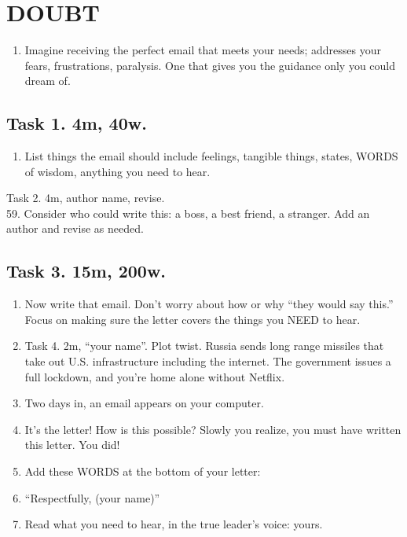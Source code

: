 \documentclass[
]{book}
\providecommand{\tightlist}{%
  \setlength{\itemsep}{0pt}\setlength{\parskip}{0pt}}
\begin{document}
\hypertarget{doubt}{%
\chapter{DOUBT}\label{doubt}}

\begin{enumerate}
\def\labelenumi{\arabic{enumi}.}
\setcounter{enumi}{56}
\tightlist
\item
  Imagine receiving the perfect email that meets your needs; addresses
  your fears, frustrations, paralysis. One that gives you the guidance
  only you could dream of.
\end{enumerate}

\hypertarget{task-1.-4m-40w.}{%
\section{Task 1. 4m, 40w.}\label{task-1.-4m-40w.}}

\begin{enumerate}
\def\labelenumi{\arabic{enumi}.}
\setcounter{enumi}{57}
\tightlist
\item
  List things the email should include feelings, tangible
  things, states, WORDS of wisdom, anything you need to hear.
\end{enumerate}

Task 2. 4m, author name, revise.\\
59. Consider who could write this: a
boss, a best friend, a stranger. Add an author and revise as needed.

\hypertarget{task-3.-15m-200w.}{%
\section{Task 3. 15m, 200w.}\label{task-3.-15m-200w.}}

\begin{enumerate}
\def\labelenumi{\arabic{enumi}.}
\setcounter{enumi}{59}
\tightlist
\item
  Now write that email. Don't worry about how or
  why ``they would say this.'' Focus on making sure the letter covers the
  things you NEED to hear.
\item
  Task 4. 2m, ``your name''. Plot twist. Russia sends long range missiles
  that take out U.S. infrastructure including the internet. The
  government issues a full lockdown, and you're home alone without
  Netflix.
\item
  Two days in, an email appears on your computer.
\item
  It's the letter! How is this possible? Slowly you realize, you must have
  written this letter. You did!
\item
  Add these WORDS at the bottom of your letter:
\item
  ``Respectfully, (your name)''
\item
  Read what you need to hear, in the true leader's voice: yours.
\end{enumerate}
\end{document}
